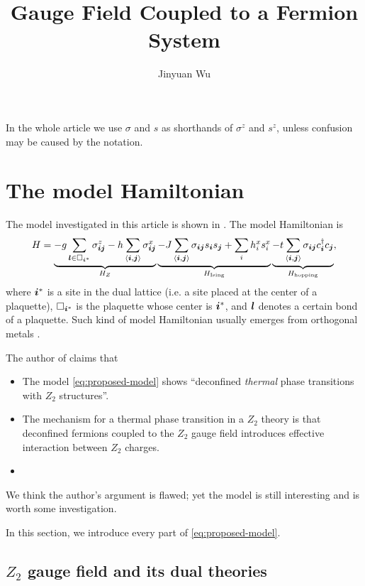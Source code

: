\documentclass[hyperref, a4paper]{article}
\title{\Ztwo Gauge Field Coupled to a Fermion System}
\author{Jinyuan Wu}
\newcommand*{\pair}[1]{\langle #1 \rangle}
\newcommand*{\Ztwo}{$\mathbb{Z}_2$ }
\def\mathbb#1{#1}%
\begin{document}
\maketitle

In the whole article we use $\sigma$ and $s$ as shorthands of $\sigma^z$ and $s^z$, unless confusion may be caused by the notation.

\section{The model Hamiltonian}

The model investigated in this article is shown in \cite{moon2019deconfined}.
The model Hamiltonian is 
\begin{equation}
    H = \underbrace{- g \sum_{\vb*{l} \in \Box_{\vb*{i}^*}} \sigma_{\vb*{i} \vb*{j}}^z - h \sum_{\pair{\vb*{i}, \vb*{j}}} \sigma^x_{\vb*{i} \vb*{j}}}_{H_Z} \underbrace{- J \sum_{\pair{\vb*{i}, \vb*{j}}} \sigma_{\vb*{i} \vb*{j}} s_{\vb*{i}} s_{\vb*{j}} + \sum_i h^x_i s^x_i}_{H_\text{Ising}} \underbrace{- t \sum_{\pair{\vb*{i}, \vb*{j}}} \sigma_{\vb*{i} \vb*{j}} c^\dagger_{\vb*{i}} c_{\vb*{j}}}_{H_\text{hopping}},
    \label{eq:proposed-model}
\end{equation}
where $\vb*{i}^*$ is a site in the dual lattice (i.e. a site placed at the center of a plaquette), 
$\Box_{\vb*{i}^*}$ is the plaquette whose center is $\vb*{i}^*$, and $\vb*{l}$ denotes a certain bond of a plaquette.
Such kind of model Hamiltonian usually emerges from orthogonal metals \cite{moon2019deconfined, orthogonal_metal}.

The author of \cite{moon2019deconfined} claims that 
\begin{itemize}
    \item The model \eqref{eq:proposed-model} shows ``deconfined \emph{thermal} phase transitions with \Ztwo structures''. 
    \item The mechanism for a thermal phase transition in a \Ztwo theory is that deconfined fermions coupled to the \Ztwo gauge field introduces effective interaction between \Ztwo charges.
    \item %
\end{itemize}
We think the author's argument is flawed; yet the model is still interesting and is worth some investigation.

In this section, we introduce every part of \eqref{eq:proposed-model}.

\subsection{\Ztwo gauge field and its dual theories}
\end{document}

